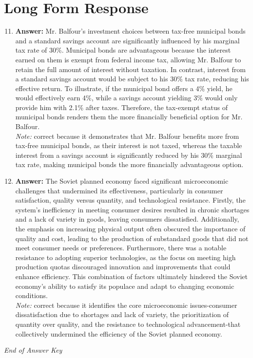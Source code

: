 \documentclass[12pt]{article}
\begin{document}
\section*{Long Form Response}
\begin{enumerate}[label=\arabic*.]
\setcounter{enumi}{10}
\item \textbf{Answer:} Mr. Balfour's investment choices between tax-free municipal bonds and a standard savings account are significantly influenced by his marginal tax rate of 30\%. Municipal bonds are advantageous because the interest earned on them is exempt from federal income tax, allowing Mr. Balfour to retain the full amount of interest without taxation. In contrast, interest from a standard savings account would be subject to his 30\% tax rate, reducing his effective return. To illustrate, if the municipal bond offers a 4\% yield, he would effectively earn 4\%, while a savings account yielding 3\% would only provide him with 2.1\% after taxes. Therefore, the tax-exempt status of municipal bonds renders them the more financially beneficial option for Mr. Balfour.
\\ \textit{Note:} correct because it demonstrates that Mr. Balfour benefits more from tax-free municipal bonds, as their interest is not taxed, whereas the taxable interest from a savings account is significantly reduced by his 30\% marginal tax rate, making municipal bonds the more financially advantageous option.
\item \textbf{Answer:} The Soviet planned economy faced significant microeconomic challenges that undermined its effectiveness, particularly in consumer satisfaction, quality versus quantity, and technological resistance. Firstly, the system's inefficiency in meeting consumer desires resulted in chronic shortages and a lack of variety in goods, leaving consumers dissatisfied. Additionally, the emphasis on increasing physical output often obscured the importance of quality and cost, leading to the production of substandard goods that did not meet consumer needs or preferences. Furthermore, there was a notable resistance to adopting superior technologies, as the focus on meeting high production quotas discouraged innovation and improvements that could enhance efficiency. This combination of factors ultimately hindered the Soviet economy's ability to satisfy its populace and adapt to changing economic conditions.
\\ \textit{Note:} correct because it identifies the core microeconomic issues-consumer dissatisfaction due to shortages and lack of variety, the prioritization of quantity over quality, and the resistance to technological advancement-that collectively undermined the efficiency of the Soviet planned economy.
\end{enumerate}

\vfill
\noindent\textit{End of Answer Key}
\end{document}
